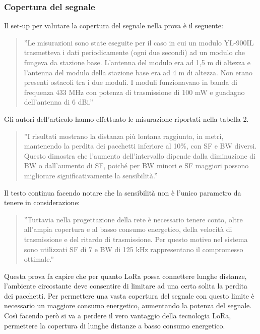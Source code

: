 \documentclass[a4paper]{report} %
\begin{document}
\subsubsection{Copertura del segnale}
Il set-up per valutare la copertura del segnale nella prova \cite{art:rif.44} è il seguente:
\begin{quote}
	''Le misurazioni sono state eseguite per il caso in cui un modulo YL-900IL trasmetteva i dati periodicamente (ogni due secondi) ad un modulo che fungeva da stazione base. L'antenna del modulo era ad 1,5 m di altezza e l'antenna del modulo della stazione base era ad 4 m di altezza. Non erano presenti ostacoli tra i due moduli. I moduli funzionavano in banda di frequenza 433 MHz con potenza di trasmissione di 100 mW e guadagno dell'antenna di 6 dBi.''
\end{quote}
Gli autori dell'articolo \cite{art:rif.44} hanno effettuato le misurazione riportati nella tabella 2. 
\begin{quote}
	''I risultati mostrano la distanza più lontana raggiunta, in metri, mantenendo la perdita dei pacchetti inferiore al 10\%, con SF e BW diversi. Questo dimostra che l'aumento dell'intervallo dipende dalla diminuzione di BW o dall'aumento di SF, poiché per BW minori e SF maggiori possono migliorare significativamente la sensibilità.''
\end{quote}
Il testo continua facendo notare che la sensibilità non è l'unico parametro da tenere in considerazione:
\begin{quote}
	''Tuttavia nella progettazione della rete è necessario tenere conto, oltre all'ampia copertura e al basso consumo energetico, della velocità di trasmissione e del ritardo di trasmissione. Per questo motivo nel sistema sono utilizzati SF di 7 e BW di 125 kHz rappresentano il compromesso ottimale.''
\end{quote}
Questa prova fa capire che per quanto LoRa possa connettere lunghe distanze, l'ambiente circostante deve consentire di limitare ad una certa solita la perdita dei pacchetti. Per permettere una vasta copertura del segnale con questo limite è necessario un maggiore consumo energetico, aumentando la potenza del segnale. Così facendo però si va a perdere il vero vantaggio della tecnologia LoRa, permettere la copertura di lunghe distanze a basso consumo energetico.  
\end{document}
